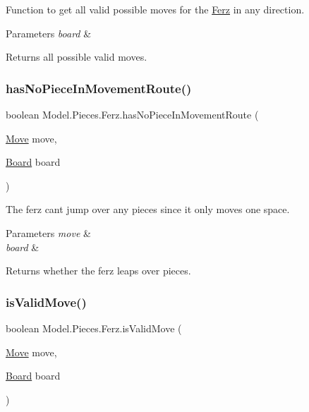 Function to get all valid possible moves for the \hyperlink{class_model_1_1_pieces_1_1_ferz}{Ferz} in any direction. 
\begin{DoxyParams}{Parameters}
{\em board} & \\
\hline
\end{DoxyParams}
\begin{DoxyReturn}{Returns}
all possible valid moves. 
\end{DoxyReturn}
\hypertarget{class_model_1_1_pieces_1_1_ferz_a71d7e41b8171d621ce3f2f83791fbdc5}{}\label{class_model_1_1_pieces_1_1_ferz_a71d7e41b8171d621ce3f2f83791fbdc5} 
\subsubsection{\texorpdfstring{has\+No\+Piece\+In\+Movement\+Route()}{hasNoPieceInMovementRoute()}}
{\footnotesize\ttfamily boolean Model.\+Pieces.\+Ferz.\+has\+No\+Piece\+In\+Movement\+Route (\begin{DoxyParamCaption}\item[{\hyperlink{class_model_1_1_move}{Move}}]{move,  }\item[{\hyperlink{class_model_1_1_board}{Board}}]{board }\end{DoxyParamCaption})}

The ferz can\textquotesingle{}t jump over any pieces since it only moves one space. 
\begin{DoxyParams}{Parameters}
{\em move} & \\
\hline
{\em board} & \\
\hline
\end{DoxyParams}
\begin{DoxyReturn}{Returns}
whether the ferz leaps over pieces. 
\end{DoxyReturn}
\hypertarget{class_model_1_1_pieces_1_1_ferz_a0251ed6241fd3884b7f192659f44a9bd}{}\label{class_model_1_1_pieces_1_1_ferz_a0251ed6241fd3884b7f192659f44a9bd} 
\subsubsection{\texorpdfstring{is\+Valid\+Move()}{isValidMove()}}
{\footnotesize\ttfamily boolean Model.\+Pieces.\+Ferz.\+is\+Valid\+Move (\begin{DoxyParamCaption}\item[{\hyperlink{class_model_1_1_move}{Move}}]{move,  }\item[{\hyperlink{class_model_1_1_board}{Board}}]{board }\end{DoxyParamCaption})}

